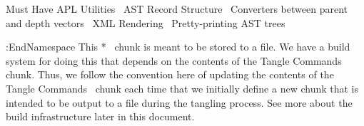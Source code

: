 \documentclass{article}%
\begin{document}
        \LA{}Must Have APL Utilities~{\nwtagstyle{}}\RA{}
        \LA{}AST Record Structure~{\nwtagstyle{}}\RA{}
        \LA{}Converters between parent and depth vectors~{\nwtagstyle{}}\RA{}
        \LA{}XML Rendering~{\nwtagstyle{}}\RA{}
        \LA{}Pretty-printing AST trees~{\nwtagstyle{}}\RA{}

:EndNamespace
\eatline
\nwnotused{*}\nwendcode{}\nwdocspar
This {\Tt{}\LA{}*~{\nwtagstyle{}}\RA{}\nwendquote} chunk is meant to be stored to a file. 
We have a build system for doing this that depends
on the contents of the {\Tt{}\LA{}Tangle Commands~{\nwtagstyle{}}\RA{}\nwendquote} chunk. 
Thus, we follow the convention here of updating the contents of 
the {\Tt{}\LA{}Tangle Commands~{\nwtagstyle{}}\RA{}\nwendquote} chunk each time that we initially define
a new chunk that is intended to be output to a file during the 
tangling process. 
See more about the build infrastructure later in this document.
\end{document}
